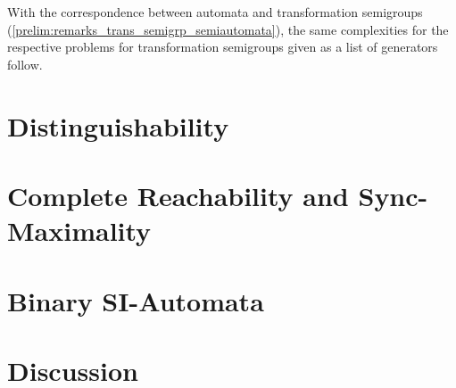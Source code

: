 
With the correspondence between automata and transformation semigroups (\cref{prelim:remarks_trans_semigrp_semiautomata}), 
the same complexities for the respective problems for transformation semigroups given as a list of generators follow.

\section{Distinguishability}
\label{sync_max:sec:decision_cd} 



\section{Complete Reachability and Sync-Maximality}
\label{sync_max:sec:decision_cr}



%

\section{Binary SI-Automata}
\label{sync_max:decision:sec:binary-SI}



\section{Discussion} 
\label{sync_max:decision:discussion}







